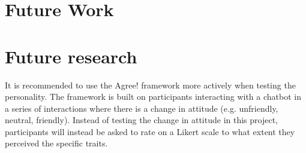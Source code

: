 \section{Future Work}
\label{sec:future}
\section{Future research}

It is recommended to use the Agree! framework \citep{Callejas2014} more actively when testing the personality. The framework is built on participants interacting with a chatbot in a series of interactions where there is a change in attitude (e.g. unfriendly, neutral, friendly). Instead of testing the change in attitude in this project, participants will instead be asked to rate on a Likert scale to what extent they perceived the specific traits.
